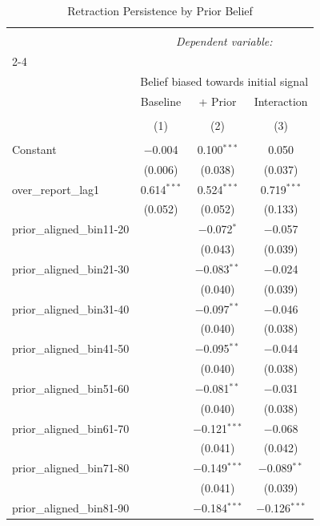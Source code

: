 
\begin{table}[!htbp] \centering 
  \caption{Retraction Persistence by Prior Belief} 
  \label{} 
\begin{tabular}{@{\extracolsep{5pt}}lccc} 
\\[-1.8ex]\hline 
\hline \\[-1.8ex] 
 & \multicolumn{3}{c}{\textit{Dependent variable:}} \\ 
\cline{2-4} 
\\[-1.8ex] & \multicolumn{3}{c}{Belief biased towards initial signal} \\ 
 & Baseline & + Prior & Interaction \\ 
\\[-1.8ex] & (1) & (2) & (3)\\ 
\hline \\[-1.8ex] 
 Constant & $-$0.004 & 0.100$^{***}$ & 0.050 \\ 
  & (0.006) & (0.038) & (0.037) \\ 
  over\_report\_lag1 & 0.614$^{***}$ & 0.524$^{***}$ & 0.719$^{***}$ \\ 
  & (0.052) & (0.052) & (0.133) \\ 
  prior\_aligned\_bin11-20 &  & $-$0.072$^{*}$ & $-$0.057 \\ 
  &  & (0.043) & (0.039) \\ 
  prior\_aligned\_bin21-30 &  & $-$0.083$^{**}$ & $-$0.024 \\ 
  &  & (0.040) & (0.039) \\ 
  prior\_aligned\_bin31-40 &  & $-$0.097$^{**}$ & $-$0.046 \\ 
  &  & (0.040) & (0.038) \\ 
  prior\_aligned\_bin41-50 &  & $-$0.095$^{**}$ & $-$0.044 \\ 
  &  & (0.040) & (0.038) \\ 
  prior\_aligned\_bin51-60 &  & $-$0.081$^{**}$ & $-$0.031 \\ 
  &  & (0.040) & (0.038) \\ 
  prior\_aligned\_bin61-70 &  & $-$0.121$^{***}$ & $-$0.068 \\ 
  &  & (0.041) & (0.042) \\ 
  prior\_aligned\_bin71-80 &  & $-$0.149$^{***}$ & $-$0.089$^{**}$ \\ 
  &  & (0.041) & (0.039) \\ 
  prior\_aligned\_bin81-90 &  & $-$0.184$^{***}$ & $-$0.126$^{***}$ \\ 

\end{tabular}
\end{table}
